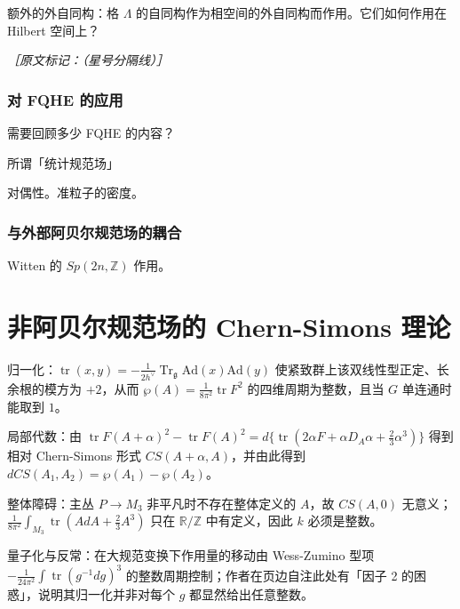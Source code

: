 额外的外自同构：格 $\Lambda$ 的自同构作为相空间的外自同构而作用。它们如何作用在 Hilbert 空间上？

{\small\itshape ［原文标记：（星号分隔线）］}

\subsubsection{对 FQHE 的应用} %

需要回顾多少 FQHE 的内容？

所谓「统计规范场」

对偶性。准粒子的密度。

\subsubsection{与外部阿贝尔规范场的耦合} %

Witten 的 $Sp(2n,\mathbb{Z})$ 作用。

\section{非阿贝尔规范场的 Chern-Simons 理论} %

\begin{keytakeaways}
  \item 归一化：$\operatorname{tr}(x,y)=-\frac{1}{2h^\vee}\operatorname{Tr}_{\mathfrak{g}}\mathrm{Ad}(x)\mathrm{Ad}(y)$ 使紧致群上该双线性型正定、长余根的模方为 $+2$，从而 $\wp(A)=\frac{1}{8\pi^2}\operatorname{tr}F^2$ 的四维周期为整数，且当 $G$ 单连通时能取到 $1$。
  \item 局部代数：由 $\operatorname{tr}F(A+\alpha)^2-\operatorname{tr}F(A)^2=d\{\operatorname{tr}(2\alpha F+\alpha D_A\alpha+\frac23\alpha^3)\}$ 得到相对 Chern-Simons 形式 $CS(A+\alpha,A)$，并由此得到 $dCS(A_1,A_2)=\wp(A_1)-\wp(A_2)$。
  \item 整体障碍：主丛 $P\to M_3$ 非平凡时不存在整体定义的 $A$，故 $CS(A,0)$ 无意义；$\frac{1}{8\pi^2}\int_{M_3}\operatorname{tr}(AdA+\frac23A^3)$ 只在 $\mathbb{R}/\mathbb{Z}$ 中有定义，因此 $k$ 必须是整数。
  \item 量子化与反常：在大规范变换下作用量的移动由 Wess-Zumino 型项 $-\frac{1}{24\pi^2}\int\operatorname{tr}(g^{-1}dg)^3$ 的整数周期控制；作者在页边自注此处有「因子 2 的困惑」，说明其归一化并非对每个 $g$ 都显然给出任意整数。
\end{keytakeaways}

